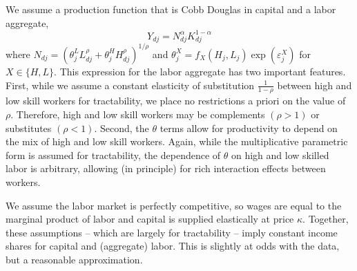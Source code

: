 \documentclass{article}
\begin{document}
We assume a production function that is Cobb Douglas in capital and a labor aggregate,
\begin{equation*}\label{eq_prod_fn}
    Y_{dj} = N_{dj}^\alpha K_{dj}^{1-\alpha}
\end{equation*}
where $N_{dj}=(\theta_{j}^L L_{dj}^\rho + \theta_{j}^H H_{dj}^\rho)^{1/\rho}$ and $\theta_{j}^X = f_X(H_{j},L_{j})\exp(\varepsilon_{j}^X)$ for $X\in\{H,L\}$. 
This expression for the labor aggregate has two important features. First, while we assume a constant elasticity of substitution $\frac{1}{1-\rho}$ between high and low skill workers for tractability, we place no restrictions a priori on the value of $\rho$. Therefore, high and low skill workers may be complements $(\rho >1)$ or substitutes $(\rho <1)$. Second, the $\theta$ terms allow for productivity to depend on the mix of high and low skill workers. Again, while the multiplicative parametric form is assumed for tractability, the dependence of $\theta$ on high and low skilled labor is arbitrary, allowing (in principle) for rich interaction effects between workers.


We assume the labor market is perfectly competitive, so wages are equal to the marginal product of labor and capital is supplied elastically at price $\kappa$. Together, these assumptions -- which are largely for tractability --  imply constant income shares for capital and (aggregate) labor. This is slightly at odds with the data, but a reasonable approximation.
\end{document}
